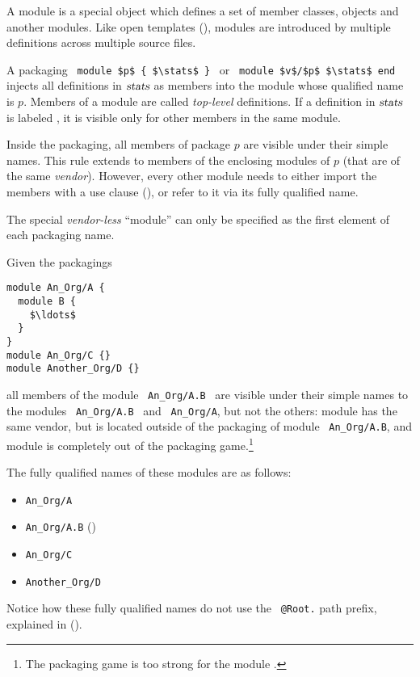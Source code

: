 A module is a special object which defines a set of member classes, objects and another modules. Like open templates (), modules are introduced by multiple definitions across multiple source files.  

A packaging ~\lstinline!module $p$ { $\stats$ }!~ or ~\lstinline!module $v$/$p$ $\stats$ end!~ injects all definitions in $\mbox{\sl stats}$ as members into the module whose qualified name is $p$. Members of a module are called {\em top-level} definitions. If a definition in $\mbox{\sl stats}$ is labeled , it is visible only for other members in the same module. 

Inside the packaging, all members of package $p$ are visible under their simple names. This rule extends to members of the enclosing modules of $p$ (that are of the same {\em vendor}). However, every other module needs to either import the members with a use clause (), or refer to it via its fully qualified name. 

The special {\em vendor-less}  ``module'' can only be specified as the first element of each packaging name. 

\example Given the packagings
\begin{lstlisting}
module An_Org/A {
  module B {
    $\ldots$
  }
}
module An_Org/C {}
module Another_Org/D {}
\end{lstlisting}
all members of the module ~\lstinline!An_Org/A.B!~ are visible under their simple names to the modules ~\lstinline!An_Org/A.B!~ and ~\lstinline!An_Org/A!, but not the others: module  has the same vendor, but is located outside of the packaging of module ~\lstinline!An_Org/A.B!, and module  is completely out of the packaging game.\footnote{The packaging game is too strong for the module .} 

The fully qualified names of these modules are as follows: 
\begin{itemize}
\item \lstinline!An_Org/A!
\item \lstinline!An_Org/A.B! ()
\item \lstinline!An_Org/C!
\item \lstinline!Another_Org/D!
\end{itemize}

Notice how these fully qualified names do not use the ~\lstinline!@Root.! path prefix, explained in ().


